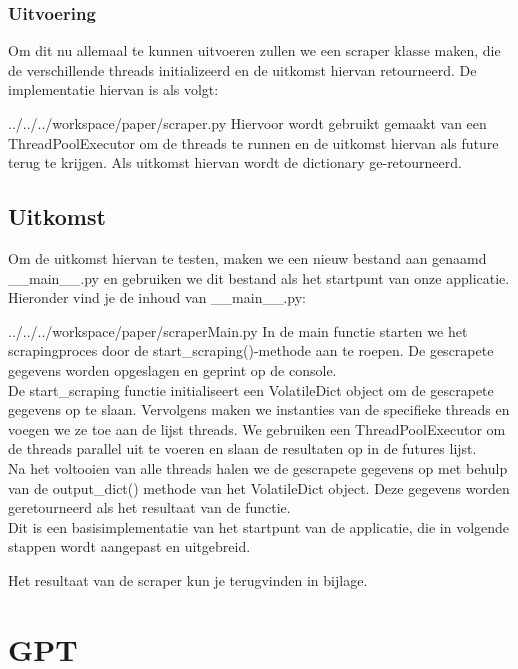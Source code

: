 \subsubsection{Uitvoering}
Om dit nu allemaal te kunnen uitvoeren zullen we een scraper klasse maken, die de verschillende threads initializeerd en de uitkomst hiervan retourneerd. De implementatie hiervan is als volgt: 
\begin{pythoncode}{../../../workspace/paper/scraper.py}
    Hiervoor wordt gebruikt gemaakt van een ThreadPoolExecutor om de threads te runnen en de uitkomst hiervan als future terug te krijgen. Als uitkomst hiervan wordt de dictionary ge-retourneerd.
\end{pythoncode}

\subsection{Uitkomst}
Om de uitkomst hiervan te testen, maken we een nieuw bestand aan genaamd \_\_main\_\_.py en gebruiken we dit bestand als het startpunt van onze applicatie. Hieronder vind je de inhoud van \_\_main\_\_.py:
\begin{pythoncode}{../../../workspace/paper/scraperMain.py}
In de main functie starten we het scrapingproces door de start\_scraping()-methode aan te roepen. De gescrapete gegevens worden opgeslagen en geprint op de console. \\

De start\_scraping functie initialiseert een VolatileDict object om de gescrapete gegevens op te slaan. Vervolgens maken we instanties van de specifieke threads en voegen we ze toe aan de lijst threads. We gebruiken een ThreadPoolExecutor om de threads parallel uit te voeren en slaan de resultaten op in de futures lijst. \\

Na het voltooien van alle threads halen we de gescrapete gegevens op met behulp van de output\_dict() methode van het VolatileDict object. Deze gegevens worden geretourneerd als het resultaat van de functie. \\

Dit is een basisimplementatie van het startpunt van de applicatie, die in volgende stappen wordt aangepast en uitgebreid.
\end{pythoncode}

Het resultaat van de scraper kun je terugvinden in bijlage.

\section{GPT}
